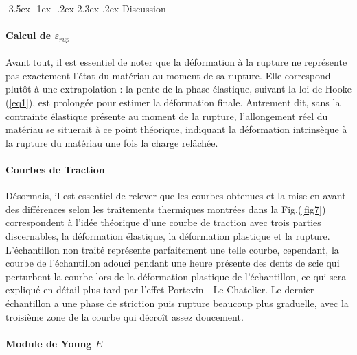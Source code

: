 \documentclass[a4paper, 12pt,oneside]{article}
\makeatletter
\renewcommand{\section}{\@startsection {section}{1}{\z@}%
             {-3.5ex \@plus -1ex \@minus -.2ex}%
             {2.3ex \@plus.2ex}%
             {\normalfont\normalsize\bfseries}}
\makeatother
\begin{document}
\vspace{-0.5cm}
\section{Discussion}
\vspace{-0.25cm}

\paragraph{Calcul de $\varepsilon_{rup}$}

Avant tout, il est essentiel de noter que la déformation à la rupture ne représente pas exactement l'état du matériau au moment de sa rupture. Elle correspond plutôt à une extrapolation : la pente de la phase élastique, suivant la loi de Hooke (\ref{eq1}), est prolongée pour estimer la déformation finale. Autrement dit, sans la contrainte élastique présente au moment de la rupture, l’allongement réel du matériau se situerait à ce point théorique, indiquant la déformation intrinsèque à la rupture du matériau une fois la charge relâchée. 

\vspace{-0.2cm}
\paragraph{Courbes de Traction}

Désormais, il est essentiel de relever que les courbes obtenues et la mise en avant des différences selon les traitements thermiques montrées dans la Fig.(\ref{fig7}) correspondent à l'idée théorique d'une courbe de traction avec trois parties discernables, la déformation élastique, la déformation plastique et la rupture. L'échantillon non traité représente parfaitement une telle courbe, cependant, la courbe de l'échantillon adouci pendant une heure présente des dents de scie qui perturbent la courbe lors de la déformation plastique de l'échantillon, ce qui sera expliqué en détail plus tard par l'effet Portevin - Le Chatelier. Le dernier échantillon a une phase de striction puis rupture beaucoup plus graduelle, avec la troisième zone de la courbe qui décroît assez doucement.

\vspace{-0.2cm}
\paragraph{Module de Young $E$}
\end{document}

